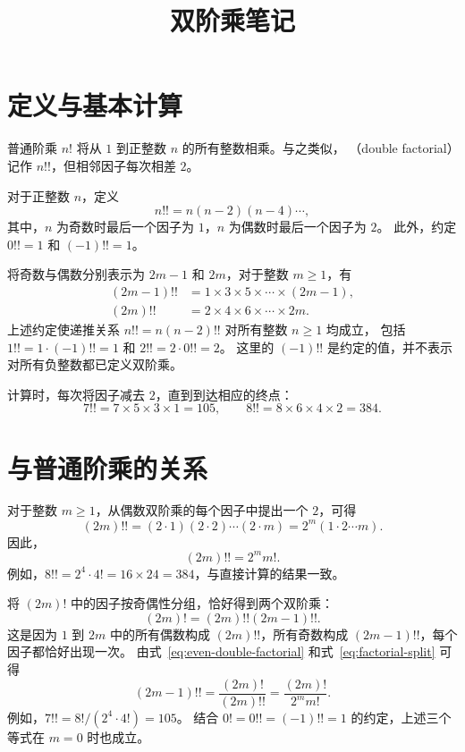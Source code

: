 \documentclass[UTF8,12pt,a4paper,fontset=fandol]{ctexart}
\title{双阶乘笔记}
\author{}
\date{}
\begin{document}
\maketitle

\section{定义与基本计算}

普通阶乘 $n!$ 将从 $1$ 到正整数 $n$ 的所有整数相乘。与之类似，
（double factorial）记作 $n!!$，但相邻因子每次相差 $2$。

\begin{definition}[双阶乘]
对于正整数 $n$，定义
\[
  n!!=n(n-2)(n-4)\cdots,
\]
其中，$n$ 为奇数时最后一个因子为 $1$，$n$ 为偶数时最后一个因子为 $2$。
此外，约定 $0!!=1$ 和 $(-1)!!=1$。
\end{definition}

将奇数与偶数分别表示为 $2m-1$ 和 $2m$，对于整数 $m\geq 1$，有
\begin{align*}
  (2m-1)!!&=1\times3\times5\times\cdots\times(2m-1),\\
  (2m)!!&=2\times4\times6\times\cdots\times2m.
\end{align*}
上述约定使递推关系 $n!!=n(n-2)!!$ 对所有整数 $n\geq1$ 均成立，
包括 $1!!=1\cdot(-1)!!=1$ 和 $2!!=2\cdot0!!=2$。
这里的 $(-1)!!$ 是约定的值，并不表示对所有负整数都已定义双阶乘。

\begin{example}[奇数与偶数的双阶乘]
计算时，每次将因子减去 $2$，直到到达相应的终点：
\[
  7!!=7\times5\times3\times1=105,\qquad
  8!!=8\times6\times4\times2=384.
\]
\end{example}

\section{与普通阶乘的关系}

对于整数 $m\geq1$，从偶数双阶乘的每个因子中提出一个 $2$，可得
\[
  (2m)!!=(2\cdot1)(2\cdot2)\cdots(2\cdot m)
  =2^m(1\cdot2\cdots m).
\]
因此，
\begin{equation}\label{eq:even-double-factorial}
  (2m)!!=2^m m!.
\end{equation}
例如，$8!!=2^4\cdot4!=16\times24=384$，与直接计算的结果一致。

将 $(2m)!$ 中的因子按奇偶性分组，恰好得到两个双阶乘：
\begin{equation}\label{eq:factorial-split}
  (2m)!=(2m)!!(2m-1)!!.
\end{equation}
这是因为 $1$ 到 $2m$ 中的所有偶数构成 $(2m)!!$，所有奇数构成
$(2m-1)!!$，每个因子都恰好出现一次。
由式~\eqref{eq:even-double-factorial} 和式~\eqref{eq:factorial-split} 可得
\begin{equation}\label{eq:odd-double-factorial}
  (2m-1)!!=\frac{(2m)!}{(2m)!!}=\frac{(2m)!}{2^m m!}.
\end{equation}
例如，$7!!=8!/(2^4\cdot4!)=105$。
结合 $0!=0!!=(-1)!!=1$ 的约定，上述三个等式在 $m=0$ 时也成立。
\end{document}

